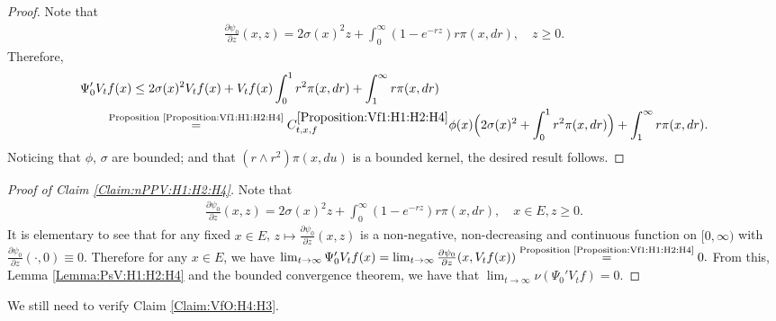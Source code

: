 \documentclass[12pt,a4paper]{amsart}
\numberwithin{equation}{section}
\theoremstyle{plain}
\theoremstyle{definition}
\theoremstyle{remark}
\newcounter{N}
\newcounter{n}[N]
\begin{document}
\begin{proof}  
Note that 
\begin{align}
 \frac{\partial \psi_0 }{ \partial z} (x,z)
= 2\sigma (x)^2 z + \int_0^\infty (1 - e^{- rz}) r \pi(x,dr),
 \quad z\geq 0.
  \end{align}
Therefore, 
\begin{align}
  \MoveEqLeft \Psi_0' V_tf(x) 
  \leq 2\sigma (x)^2 V_t f(x) + V_t f(x) \int_0^1 r^2 \pi(x,dr) + \int_1^\infty r \pi(x,dr)
  \\&\overset{\text{Proposition \ref{Proposition:Vf1:H1:H2:H4}}}= C^{\ref{Proposition:Vf1:H1:H2:H4}}_{t,x,f} \phi(x) \Big(2\sigma (x)^2 +\int_0^1 r^2 \pi(x,dr) \Big)+ \int_1^\infty r \pi(x,dr).
  \end{align}
  Noticing that $\phi$, $\sigma$ are bounded; and that $(r\wedge r^2)\pi(x,du)$ is a bounded kernel, the desired result follows.
\end{proof}
\begin{proof}[{Proof of Claim \ref{Claim:nPPV:H1:H2:H4}}]
	Note that 
	\begin{align}
	\frac{\partial \psi_0 }{ \partial z} (x,z)
	= 2\sigma (x)^2 z + \int_0^\infty (1 - e^{- rz}) r \pi(x,dr), 
	\quad x\in E, z\geq 0.
	\end{align}
	It is elementary to see that for any fixed $x\in E$, $z\mapsto \frac{\partial \psi_0}{\partial z} (x,z)$ is a non-negative, non-decreasing and continuous function on $[0,\infty)$ with $\frac{\partial \psi_0}{\partial z} (\cdot,0) \equiv 0$.  
	Therefore for any $x\in E$, we have
	$\lim_{t\to \infty} \Psi_0' V_tf(x) 
	=\lim_{t\to \infty} \frac{\partial \psi_0}{ \partial z}(x,V_tf(x)) 
	\overset{\text{Proposition \ref{Proposition:Vf1:H1:H2:H4}}}{=} 0. $
From this, Lemma \ref{Lemma:PsV:H1:H2:H4} and the bounded convergence theorem, we have that 
	$\lim_{t\to \infty}\nu(\Psi_0' V_tf)  = 0. $
\end{proof}
	We still need to verify Claim \ref{Claim:VfO:H4:H3}.
\end{document}
